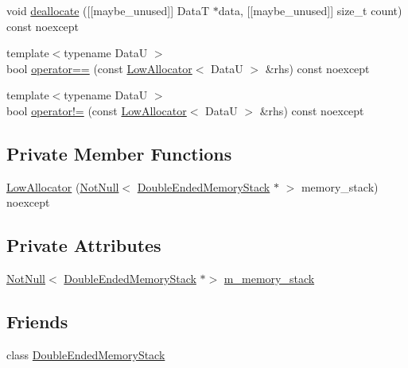 \begin{DoxyCompactItemize}
\item 
void \hyperlink{classmage_1_1_double_ended_memory_stack_1_1_low_allocator_ae3f8edcb5b929749a627708434c9db73}{deallocate} (\mbox{[}\mbox{[}maybe\+\_\+unused\mbox{]}\mbox{]} DataT $\ast$data, \mbox{[}\mbox{[}maybe\+\_\+unused\mbox{]}\mbox{]} size\+\_\+t count) const noexcept
\item 
{\footnotesize template$<$typename DataU $>$ }\\bool \hyperlink{classmage_1_1_double_ended_memory_stack_1_1_low_allocator_a0353aa1e03cf37527ab24c268af8773f}{operator==} (const \hyperlink{classmage_1_1_double_ended_memory_stack_1_1_low_allocator}{Low\+Allocator}$<$ DataU $>$ \&rhs) const noexcept
\item 
{\footnotesize template$<$typename DataU $>$ }\\bool \hyperlink{classmage_1_1_double_ended_memory_stack_1_1_low_allocator_a521ea849cc47616c8a40b86185d08f9b}{operator!=} (const \hyperlink{classmage_1_1_double_ended_memory_stack_1_1_low_allocator}{Low\+Allocator}$<$ DataU $>$ \&rhs) const noexcept
\end{DoxyCompactItemize}
\subsection*{Private Member Functions}
\begin{DoxyCompactItemize}
\item 
\hyperlink{classmage_1_1_double_ended_memory_stack_1_1_low_allocator_a8449525406fdc6da075cf1e3bb0c9332}{Low\+Allocator} (\hyperlink{namespacemage_a8769f9d670d6b585ea306cb1062af94b}{Not\+Null}$<$ \hyperlink{classmage_1_1_double_ended_memory_stack}{Double\+Ended\+Memory\+Stack} $\ast$ $>$ memory\+\_\+stack) noexcept
\end{DoxyCompactItemize}
\subsection*{Private Attributes}
\begin{DoxyCompactItemize}
\item 
\hyperlink{namespacemage_a8769f9d670d6b585ea306cb1062af94b}{Not\+Null}$<$ \hyperlink{classmage_1_1_double_ended_memory_stack}{Double\+Ended\+Memory\+Stack} $\ast$$>$ \hyperlink{classmage_1_1_double_ended_memory_stack_1_1_low_allocator_a96d9553c3c37445cc1e8b15399784a1b}{m\+\_\+memory\+\_\+stack}
\end{DoxyCompactItemize}
\subsection*{Friends}
\begin{DoxyCompactItemize}
\item 
class \hyperlink{classmage_1_1_double_ended_memory_stack_1_1_low_allocator_a10ae729d55b8c0017057250445835680}{Double\+Ended\+Memory\+Stack}
\end{DoxyCompactItemize}


